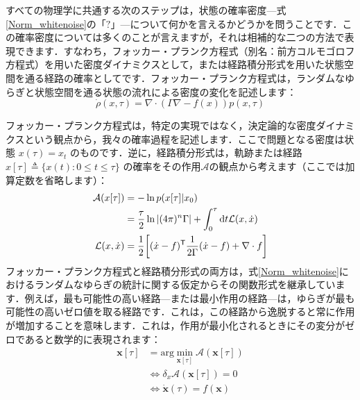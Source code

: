 \documentclass[a4paper, titlepage]{jsarticle}
\begin{document}
\par
すべての物理学に共通する次のステップは，状態の確率密度—式\eqref{Norm_whitenoise}の「$?$」—について何かを言えるかどうかを問うことです．この確率密度については多くのことが言えますが，それは相補的な二つの方法で表現できます．すなわち，フォッカー・プランク方程式（別名：前方コルモゴロフ方程式）を用いた密度ダイナミクスとして，または経路積分形式を用いた状態空間を通る経路の確率としてです．フォッカー・プランク方程式は，ランダムなゆらぎと状態空間を通る状態の流れによる密度の変化を記述します：
\begin{equation}\label{Fokker_Planck}
    \dot{\rho}(x, \tau) = \nabla \cdot (\Gamma \nabla - f(x))p(x, \tau)  
\end{equation}
\par
フォッカー・プランク方程式は，特定の実現ではなく，決定論的な密度ダイナミクスという観点から，我々の確率過程を記述します．ここで問題となる密度は状態 $x(\tau) = x_t$ のものです．逆に，経路積分形式は，軌跡または経路 $x[\tau]\triangleq\{x(t): 0 \le t \le \tau\}$ の確率をその作用$\mathcal{A}$の観点から考えます（ここでは加算定数を省略します）：
\begin{equation}\label{Fokker_Planck_PathIntegral}
    \begin{aligned}
        \mathcal{A}(x[\tau]) &= - \ln p(x[\tau] | x_0) \\
        &= \frac{\tau}{2} \ln |(4\pi)^n\Gamma| + \int_0^\tau \mathrm{d}t \mathcal{L}(x, \dot{x}) \\
        \mathcal{L}(x, \dot{x}) &= \frac{1}{2}\qty[(\dot{x} - f)^\mathsf{T}\frac{1}{2\Gamma}(\dot{x} - f) + \nabla \cdot f]
    \end{aligned}
\end{equation}
フォッカー・プランク方程式と経路積分形式の両方は，式\eqref{Norm_whitenoise}におけるランダムなゆらぎの統計に関する仮定からその関数形式を継承しています．例えば，最も可能性の高い経路—または最小作用の経路—は，ゆらぎが最も可能性の高いゼロ値を取る経路です．これは，この経路から逸脱すると常に作用が増加することを意味します．これは，作用が最小化されるときにその変分がゼロであると数学的に表現されます：
\begin{equation}\label{Minimum_Path}
    \begin{aligned}
        \mathbf{x}[\tau] &= \mathrm{arg}\underset{\mathbf{x}[\tau]}{\operatorname{min}}\mathcal{A}(\mathbf{x}[\tau]) \\
        &\Leftrightarrow \delta_x \mathcal{A}(\mathbf{x}[\tau]) = 0 \\
        &\Leftrightarrow \dot{\mathbf{x}}(\tau) = f(\mathbf{x})
    \end{aligned}
\end{equation}
\end{document}
